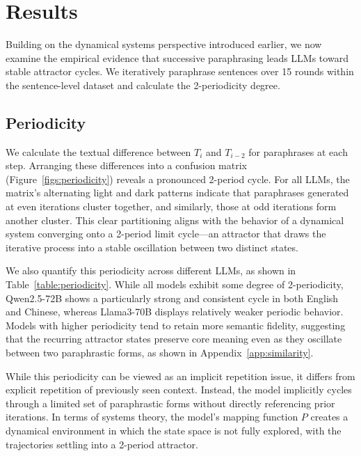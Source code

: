 \section{Results}
\label{sec:main}
Building on the dynamical systems perspective introduced earlier, we now examine the empirical evidence that successive paraphrasing leads LLMs toward stable attractor cycles. 
We iteratively paraphrase sentences over 15 rounds within the sentence-level dataset and calculate the 2-periodicity degree.

\subsection{Periodicity}
\label{Periodicity}
We calculate the textual difference between $T_i$ and $T_{i-2}$ for paraphrases at each step. 
Arranging these differences into a confusion matrix (Figure~\ref{figs:periodicity}) reveals a pronounced 2-period cycle. 
For all LLMs, the matrix’s alternating light and dark patterns indicate that paraphrases generated at even iterations cluster together, and similarly, those at odd iterations form another cluster. 
This clear partitioning aligns with the behavior of a dynamical system converging onto a 2-period limit cycle—an attractor that draws the iterative process into a stable oscillation between two distinct states.

We also quantify this periodicity across different LLMs, as shown in Table~\ref{table:periodicity}. While all models exhibit some degree of 2-periodicity, Qwen2.5-72B shows a particularly strong and consistent cycle in both English and Chinese, whereas Llama3-70B displays relatively weaker periodic behavior. 
Models with higher periodicity tend to retain more semantic fidelity, suggesting that the recurring attractor states preserve core meaning even as they oscillate between two paraphrastic forms, as shown in Appendix~\ref{app:similarity}. 

While this periodicity can be viewed as an implicit repetition issue, it differs from explicit repetition of previously seen context. 
Instead, the model implicitly cycles through a limited set of paraphrastic forms without directly referencing prior iterations. 
In terms of systems theory, the model’s mapping function $P$ creates a dynamical environment in which the state space is not fully explored, with the trajectories settling into a 2-period attractor.


